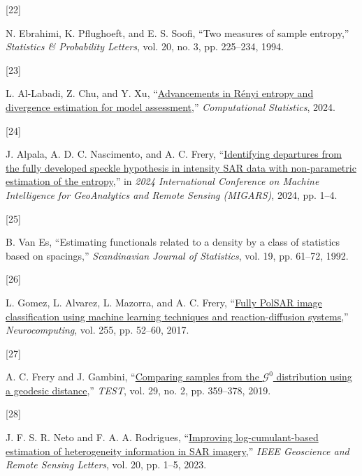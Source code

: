 \documentclass[
  lettersize  journal,
]{IEEEtran}%
\newlength{\cslhangindent}
\newlength{\csllabelwidth}
\newenvironment{CSLReferences}[2] %
 {\begin{list}{}{%
  \setlength{\itemindent}{0pt}
  \setlength{\leftmargin}{0pt}
  \setlength{\parsep}{0pt}
  \ifodd #1
   \setlength{\leftmargin}{\cslhangindent}
   \setlength{\itemindent}{-1\cslhangindent}
  \fi
  \setlength{\itemsep}{#2\baselineskip}}}
 {\end{list}}
\newcommand{\CSLLeftMargin}[1]{\parbox[t]{\csllabelwidth}{\strut#1\strut}}
\newcommand{\CSLRightInline}[1]{\parbox[t]{\linewidth - \csllabelwidth}{\strut#1\strut}}
\begin{document}
\begin{CSLReferences}{0}{0}
\CSLLeftMargin{{[}22{]} }%
\CSLRightInline{N. Ebrahimi, K. Pflughoeft, and E. S. Soofi, {``Two
measures of sample entropy,''} \emph{Statistics \& Probability Letters},
vol. 20, no. 3, pp. 225--234, 1994. }

\CSLLeftMargin{{[}23{]} }%
\CSLRightInline{L. Al-Labadi, Z. Chu, and Y. Xu,
{``\href{https://doi.org/10.1007/s00180-024-01507-z}{Advancements in
{R}ényi entropy and divergence estimation for model assessment},''}
\emph{Computational Statistics}, 2024. }

\CSLLeftMargin{{[}24{]} }%
\CSLRightInline{J. Alpala, A. D. C. Nascimento, and A. C. Frery,
{``\href{https://doi.org/10.1109/migars61408.2024.10544448}{Identifying
departures from the fully developed speckle hypothesis in intensity
{SAR} data with non-parametric estimation of the entropy},''} in
\emph{2024 {I}nternational {C}onference on {M}achine {I}ntelligence for
{G}eo{A}nalytics and {R}emote {S}ensing ({MIGARS})}, 2024, pp. 1--4. }

\CSLLeftMargin{{[}25{]} }%
\CSLRightInline{B. Van Es, {``Estimating functionals related to a
density by a class of statistics based on spacings,''}
\emph{Scandinavian Journal of Statistics}, vol. 19, pp. 61--72, 1992. }

\CSLLeftMargin{{[}26{]} }%
\CSLRightInline{L. Gomez, L. Alvarez, L. Mazorra, and A. C. Frery,
{``\href{https://doi.org/10.1016/j.neucom.2016.08.140}{Fully PolSAR
image classification using machine learning techniques and
reaction-diffusion systems},''} \emph{Neurocomputing}, vol. 255, pp.
52--60, 2017. }

\CSLLeftMargin{{[}27{]} }%
\CSLRightInline{A. C. Frery and J. Gambini,
{``\href{https://doi.org/10.1007/s11749-019-00658-2}{Comparing samples
from the \({\mathcal {G}}^0\) distribution using a geodesic
distance},''} \emph{TEST}, vol. 29, no. 2, pp. 359--378, 2019. }

\CSLLeftMargin{{[}28{]} }%
\CSLRightInline{J. F. S. R. Neto and F. A. A. Rodrigues,
{``\href{https://doi.org/10.1109/lgrs.2023.3305119}{Improving
log-cumulant-based estimation of heterogeneity information in {SAR}
imagery},''} \emph{{IEEE} Geoscience and Remote Sensing Letters}, vol.
20, pp. 1--5, 2023. }

\end{CSLReferences}
\end{document}

